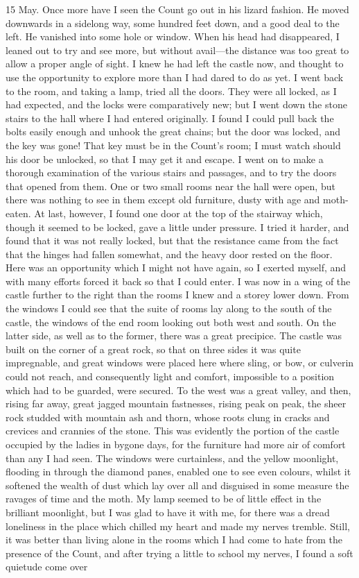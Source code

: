 \begin{diary}{15 May.}
Once more have I seen the Count go out in his lizard fashion. He moved downwards in a sidelong way, some hundred feet down, and a good deal to the left. He vanished into some hole or window. When his head had disappeared, I leaned out to try and see more, but without avail—the distance was too great to allow a proper angle of sight. I knew he had left the castle now, and thought to use the opportunity to explore more than I had dared to do as yet. I went back to the room, and taking a lamp, tried all the doors. They were all locked, as I had expected, and the locks were comparatively new; but I went down the stone stairs to the hall where I had entered originally. I found I could pull back the bolts easily enough and unhook the great chains; but the door was locked, and the key was gone! That key must be in the Count's room; I must watch should his door be unlocked, so that I may get it and escape. I went on to make a thorough examination of the various stairs and passages, and to try the doors that opened from them. One or two small rooms near the hall were open, but there was nothing to see in them except old furniture, dusty with age and moth-eaten. At last, however, I found one door at the top of the stairway which, though it seemed to be locked, gave a little under pressure. I tried it harder, and found that it was not really locked, but that the resistance came from the fact that the hinges had fallen somewhat, and the heavy door rested on the floor. Here was an opportunity which I might not have again, so I exerted myself, and with many efforts forced it back so that I could enter. I was now in a wing of the castle further to the right than the rooms I knew and a storey lower down. From the windows I could see that the suite of rooms lay along to the south of the castle, the windows of the end room looking out both west and south. On the latter side, as well as to the former, there was a great precipice. The castle was built on the corner of a great rock, so that on three sides it was quite impregnable, and great windows were placed here where sling, or bow, or culverin could not reach, and consequently light and comfort, impossible to a position which had to be guarded, were secured. To the west was a great valley, and then, rising far away, great jagged mountain fastnesses, rising peak on peak, the sheer rock studded with mountain ash and thorn, whose roots clung in cracks and crevices and crannies of the stone. This was evidently the portion of the castle occupied by the ladies in bygone days, for the furniture had more air of comfort than any I had seen. The windows were curtainless, and the yellow moonlight, flooding in through the diamond panes, enabled one to see even colours, whilst it softened the wealth of dust which lay over all and disguised in some measure the ravages of time and the moth. My lamp seemed to be of little effect in the brilliant moonlight, but I was glad to have it with me, for there was a dread loneliness in the place which chilled my heart and made my nerves tremble. Still, it was better than living alone in the rooms which I had come to hate from the presence of the Count, and after trying a little to school my nerves, I found a soft quietude come over 
\end{diary}
